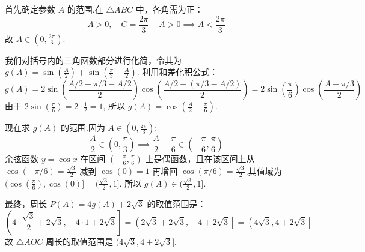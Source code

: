 \begin{prob-sol}
首先确定参数 $A$ 的范围.在 $\triangle ABC$ 中，各角需为正：
\[
A>0, \quad C = \frac{2\pi}{3}-A > 0 \implies A < \frac{2\pi}{3}
\]
故 $A \in (0, \frac{2\pi}{3})$.

我们对括号内的三角函数部分进行化简，令其为 $g(A) = \sin(\frac{A}{2}) + \sin(\frac{\pi}{3}-\frac{A}{2})$.
利用和差化积公式：
\[
g(A) = 2\sin\left(\frac{A/2 + \pi/3-A/2}{2}\right)\cos\left(\frac{A/2 - (\pi/3-A/2)}{2}\right) = 2\sin\left(\frac{\pi}{6}\right)\cos\left(\frac{A-\pi/3}{2}\right)
\]
由于 $2\sin(\frac{\pi}{6}) = 2 \cdot \frac{1}{2} = 1$, 所以 $g(A) = \cos\left(\frac{A}{2}-\frac{\pi}{6}\right)$.

现在求 $g(A)$ 的范围.因为 $A \in (0, \frac{2\pi}{3})$:
\[
\frac{A}{2} \in \left(0, \frac{\pi}{3}\right) \implies \frac{A}{2}-\frac{\pi}{6} \in \left(-\frac{\pi}{6}, \frac{\pi}{6}\right)
\]
余弦函数 $y=\cos x$ 在区间 $(-\frac{\pi}{6}, \frac{\pi}{6})$ 上是偶函数，且在该区间上从 $\cos(-\pi/6)=\frac{\sqrt{3}}{2}$ 减到 $\cos(0)=1$ 再增回 $\cos(\pi/6)=\frac{\sqrt{3}}{2}$.其值域为 $(\cos(\frac{\pi}{6}), \cos(0)] = (\frac{\sqrt{3}}{2}, 1]$.
所以 $g(A) \in (\frac{\sqrt{3}}{2}, 1]$.

最终，周长 $P(A) = 4g(A) + 2\sqrt{3}$ 的取值范围是：
\[
\left(4 \cdot \frac{\sqrt{3}}{2} + 2\sqrt{3}, \quad 4 \cdot 1 + 2\sqrt{3}\right] = \left(2\sqrt{3} + 2\sqrt{3}, \quad 4 + 2\sqrt{3}\right] = \left(4\sqrt{3}, 4+2\sqrt{3}\right]
\]
故 $\triangle AOC$ 周长的取值范围是 $(4\sqrt{3}, 4+2\sqrt{3}]$.\hfill\qedsymbol
\end{prob-sol}
